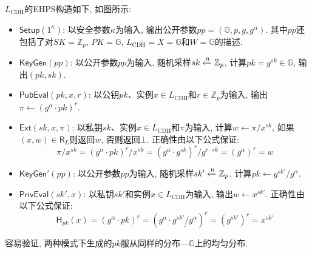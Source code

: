 \begin{construction}
$L_\text{CDH}$的EHPS构造如下, 如图所示: 
\begin{itemize}
\item $\mathsf{Setup}(1^\kappa)$: 以安全参数$\kappa$为输入, 输出公开参数$pp = (\mathbb{G}, p, g, g^\alpha)$. 
	其中$pp$还包括了对$SK = \mathbb{Z}_p$, $PK = \mathbb{G}$, $L_\text{CDH} = X = \mathbb{G}$和$W = \mathbb{G}$的描述. 

\item $\mathsf{KeyGen}(pp)$: 以公开参数$pp$为输入, 随机采样$sk \xleftarrow{\textup{\tiny R}} \mathbb{Z}_p$, 
	计算$pk = g^{sk} \in \mathbb{G}$, 输出$(pk, sk)$. 

\item $\mathsf{PubEval}(pk, x, r)$: 以公钥$pk$、实例$x \in L_\text{CDH}$和$r \in \mathbb{Z}_p$为输入, 输出$\pi \leftarrow (g^{\alpha} \cdot pk)^r$. 

\item $\mathsf{Ext}(sk, x, \pi)$: 以私钥$sk$、实例$x \in L_\text{CDH}$和$\pi$为输入, 计算$w \leftarrow \pi /x^{sk}$, 
	如果$(x, w) \in \mathsf{R}_L$则返回$w$, 否则返回$\bot$. 正确性由以下公式保证: 
	\begin{equation*}
		\pi /x^{sk} = (g^{\alpha} \cdot pk)^r /x^{sk} = (g^{\alpha} \cdot g^{sk})^r /g^{r \cdot sk} = (g^\alpha)^r = w 
	\end{equation*}

\item $\mathsf{KeyGen}'(pp)$: 以公开参数$pp$为输入, 随机采样$sk' \xleftarrow{\textup{\tiny R}} \mathbb{Z}_p$, 计算$pk \leftarrow g^{sk'}/g^\alpha$. 

\item $\mathsf{PrivEval}(sk', x)$: 以私钥$sk'$和实例$x \in L_\text{CDH}$为输入, 输出$w \leftarrow x^{sk'}$.  正确性由以下公式保证: 
	\begin{equation*}
		\mathsf{H}_{pk}(x) = (g^\alpha \cdot pk)^r = (g^{\alpha} \cdot \underline{g^{sk'}/g^\alpha})^r = (g^{sk'})^r = x^{sk'}
	\end{equation*}	
\end{itemize}

容易验证, 两种模式下生成的$pk$服从同样的分布—$\mathbb{G}$上的均匀分布. 
\end{construction}

